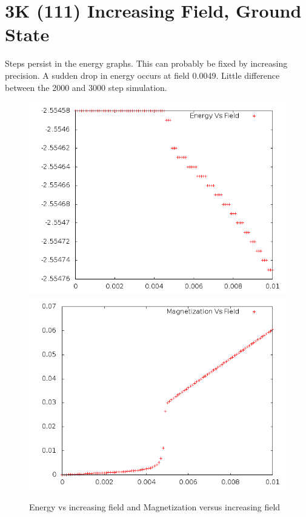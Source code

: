 \documentclass{article}
\begin{document}
\section{3K (111) Increasing Field, Ground State}
Steps persist in the energy graphs. This can probably be fixed by increasing precision. 
A sudden drop in energy occurs at field 0.0049. Little difference between the 2000 and 3000 step simulation.
\begin{figure}[h]
 \centering 
\includegraphics[scale=0.3]{111_3000/E000to005G.png}
\includegraphics[scale=0.3]{111_3000/M000to005G.png}
\caption{Energy vs increasing field and Magnetization versus increasing field}
\end{figure}
\end{document}
